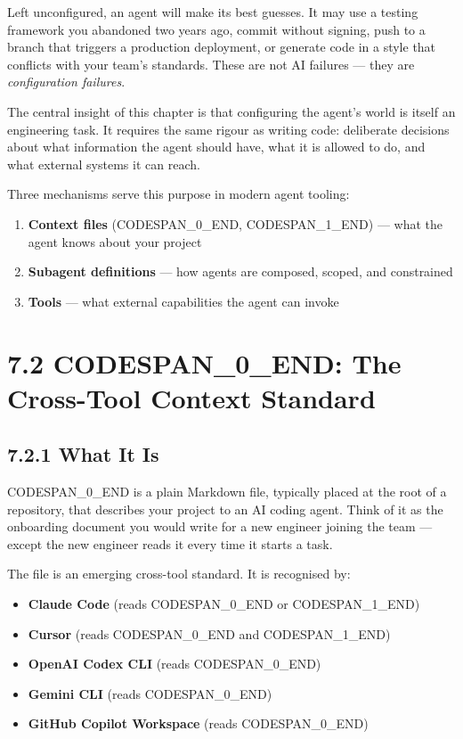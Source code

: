 \documentclass[11pt,a4paper]{book}
\begin{document}
Left unconfigured, an agent will make its best guesses. It may use a testing framework you abandoned two years ago, commit without signing, push to a branch that triggers a production deployment, or generate code in a style that conflicts with your team's standards. These are not AI failures --- they are \textit{configuration failures}.

The central insight of this chapter is that configuring the agent's world is itself an engineering task. It requires the same rigour as writing code: deliberate decisions about what information the agent should have, what it is allowed to do, and what external systems it can reach.

Three mechanisms serve this purpose in modern agent tooling:

\begin{enumerate}
  \item \textbf{Context files} (CODESPAN\_0\_END, CODESPAN\_1\_END) --- what the agent knows about your project
  \item \textbf{Subagent definitions} --- how agents are composed, scoped, and constrained
  \item \textbf{Tools} --- what external capabilities the agent can invoke
\end{enumerate}

\medskip

\section{7.2 CODESPAN\_0\_END: The Cross-Tool Context Standard}

\subsection{7.2.1 What It Is}

CODESPAN\_0\_END is a plain Markdown file, typically placed at the root of a repository, that describes your project to an AI coding agent. Think of it as the onboarding document you would write for a new engineer joining the team --- except the new engineer reads it every time it starts a task.

The file is an emerging cross-tool standard. It is recognised by:

\begin{itemize}
  \item \textbf{Claude Code} (reads CODESPAN\_0\_END or CODESPAN\_1\_END)
  \item \textbf{Cursor} (reads CODESPAN\_0\_END and CODESPAN\_1\_END)
  \item \textbf{OpenAI Codex CLI} (reads CODESPAN\_0\_END)
  \item \textbf{Gemini CLI} (reads CODESPAN\_0\_END)
  \item \textbf{GitHub Copilot Workspace} (reads CODESPAN\_0\_END)
\end{itemize}
\end{document}
